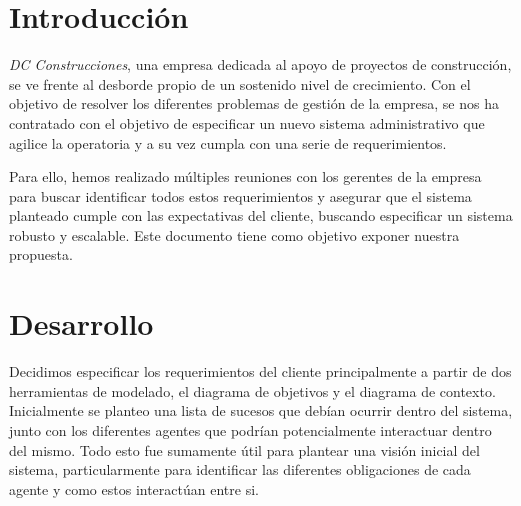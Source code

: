 \documentclass{article}
\theoremstyle{definition}
\theoremstyle{remark}
\begin{document}
{} %

\grupo{}

 
\maketitle

\pagebreak

\tableofcontents

\pagebreak


\section{Introducción}

\textit{DC Construcciones}, una empresa dedicada al apoyo de proyectos de construcción, se ve frente al desborde propio de un sostenido nivel de crecimiento. Con el objetivo de resolver los diferentes problemas de gestión de la empresa, se nos ha contratado con el objetivo de especificar un nuevo sistema administrativo que agilice la operatoria y a su vez cumpla con una serie de requerimientos.

Para ello, hemos realizado múltiples reuniones con los gerentes de la empresa para buscar identificar todos estos requerimientos y asegurar que el sistema planteado cumple con las expectativas del cliente, buscando especificar un sistema robusto y escalable. Este documento tiene como objetivo exponer nuestra propuesta.

\section{Desarrollo}

Decidimos especificar los requerimientos del cliente principalmente a partir de dos herramientas de modelado, el diagrama de objetivos y el diagrama de contexto. Inicialmente se planteo una lista de sucesos que debían ocurrir dentro del sistema, junto con los diferentes agentes que podrían potencialmente interactuar dentro del mismo. Todo esto fue sumamente útil para plantear una visión inicial del sistema, particularmente para identificar las diferentes obligaciones de cada agente y como estos interactúan entre si.
\end{document}
